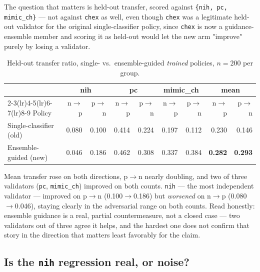 \documentclass[11pt]{article}
\begin{document}
The question that matters is held-out transfer, scored against
\texttt{\{nih, pc, mimic\_ch\}} — not against \texttt{chex} as well, even
though \texttt{chex} was a legitimate held-out validator for the original
single-classifier policy, since \texttt{chex} is now a guidance-ensemble
member and scoring it as held-out would let the new arm "improve" purely
by losing a validator.

\begin{table}[h]
\centering
\caption{Held-out transfer ratio, single- vs.\ ensemble-guided
\emph{trained} policies, $n=200$ per group.}
\label{tab:closing_transfer}
\begin{tabular}{@{}lrrrrrrrr@{}}
\toprule
& \multicolumn{2}{c}{nih} & \multicolumn{2}{c}{pc} & \multicolumn{2}{c}{mimic\_ch} & \multicolumn{2}{c}{mean} \\
\cmidrule(lr){2-3}\cmidrule(lr){4-5}\cmidrule(lr){6-7}\cmidrule(lr){8-9}
Policy & n$\to$p & p$\to$n & n$\to$p & p$\to$n & n$\to$p & p$\to$n & n$\to$p & p$\to$n \\
\midrule
Single-classifier (old) & 0.080 & 0.100 & 0.414 & 0.224 & 0.197 & 0.112 & 0.230 & 0.146 \\
Ensemble-guided (new)   & 0.046 & 0.186 & 0.462 & 0.308 & 0.337 & 0.384 & \textbf{0.282} & \textbf{0.293} \\
\bottomrule
\end{tabular}
\end{table}

Mean transfer rose on both directions, p$\to$n nearly doubling, and two of
three validators (\texttt{pc}, \texttt{mimic\_ch}) improved on both counts.
\texttt{nih} — the most independent validator — improved on p$\to$n
(0.100$\to$0.186) but \emph{worsened} on n$\to$p (0.080$\to$0.046),
staying clearly in the adversarial range on both counts. Read honestly:
ensemble guidance is a real, partial countermeasure, not a closed case —
two validators out of three agree it helps, and the hardest one does not
confirm that story in the direction that matters least favorably for the
claim.

\subsection{Is the \texttt{nih} regression real, or noise?}
\label{sec:transfer_ci}
\end{document}
